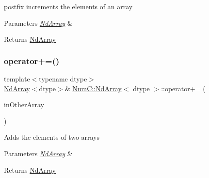 postfix increments the elements of an array


\begin{DoxyParams}{Parameters}
{\em \mbox{\hyperlink{class_num_c_1_1_nd_array}{Nd\+Array}}} & \\
\hline
\end{DoxyParams}
\begin{DoxyReturn}{Returns}
\mbox{\hyperlink{class_num_c_1_1_nd_array}{Nd\+Array}} 
\end{DoxyReturn}
\mbox{\label{class_num_c_1_1_nd_array_ada038e83835f7cdcb8173ab7e40a7805}} 
\subsubsection{\texorpdfstring{operator+=()}{operator+=()}\hspace{0.1cm}{\footnotesize\ttfamily [1/2]}}
{\footnotesize\ttfamily template$<$typename dtype$>$ \\
\mbox{\hyperlink{class_num_c_1_1_nd_array}{Nd\+Array}}$<$dtype$>$\& \mbox{\hyperlink{class_num_c_1_1_nd_array}{Num\+C\+::\+Nd\+Array}}$<$ dtype $>$\+::operator+= (\begin{DoxyParamCaption}\item[{const \mbox{\hyperlink{class_num_c_1_1_nd_array}{Nd\+Array}}$<$ dtype $>$ \&}]{in\+Other\+Array }\end{DoxyParamCaption})\hspace{0.3cm}{\ttfamily [inline]}}

Adds the elements of two arrays


\begin{DoxyParams}{Parameters}
{\em \mbox{\hyperlink{class_num_c_1_1_nd_array}{Nd\+Array}}} & \\
\hline
\end{DoxyParams}
\begin{DoxyReturn}{Returns}
\mbox{\hyperlink{class_num_c_1_1_nd_array}{Nd\+Array}} 
\end{DoxyReturn}
\mbox{\label{class_num_c_1_1_nd_array_adf334fdf113d91cea91d7b8bf68b7291}} 
